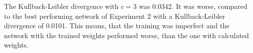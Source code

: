 The Kullback-Leibler divergence with $c = 3$ was 0.0342. It was worse, compared to the best performing network of Experiment 2 with a Kullback-Leibler divergence of 0.0101. This means, that the training was imperfect and the network with the trained weights performed worse, than the one with calculated weights.